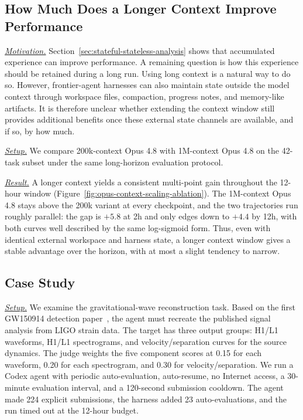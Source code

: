 \subsection{How Much Does a Longer Context Improve Performance}
\label{sec:context-length-analysis}
\label{sec:ralphloop}

\underline{\textit{Motivation.}} Section~\ref{sec:stateful-stateless-analysis} shows that accumulated experience can improve performance. A remaining question is how this experience should be retained during a long run. Using long context is a natural way to do so. However, frontier-agent harnesses can also maintain state outside the model context through workspace files, compaction, progress notes, and memory-like artifacts. It is therefore unclear whether extending the context window still provides additional benefits once these external state channels are available, and if so, by how much.

\underline{\textit{Setup.}} We compare 200k-context Opus 4.8 with 1M-context Opus 4.8 on the 42-task subset under the same long-horizon evaluation protocol.

\underline{\textit{Result.}} A longer context yields a consistent multi-point gain throughout the 12-hour window (Figure~\ref{fig:opus-context-scaling-ablation}). The 1M-context Opus 4.8 stays above the 200k variant at every checkpoint, and the two trajectories run roughly parallel: the gap is $+5.8$ at 2h and only edges down to $+4.4$ by 12h, with both curves well described by the same log-sigmoid form. Thus, even with identical external workspace and harness state, a longer context window gives a stable advantage over the horizon, with at most a slight tendency to narrow.

\subsection{Case Study}
\label{sec:case-study}

\underline{\textit{Setup.}} We examine the gravitational-wave reconstruction task. Based on the first GW150914 detection paper~\cite{abbott2016observation}, the agent must recreate the published signal analysis from LIGO strain data. The target has three output groups: H1/L1 waveforms, H1/L1 spectrograms, and velocity/separation curves for the source dynamics. The judge weights the five component scores at 0.15 for each waveform, 0.20 for each spectrogram, and 0.30 for velocity/separation. We run a Codex agent with periodic auto-evaluation, auto-resume, no Internet access, a 30-minute evaluation interval, and a 120-second submission cooldown. The agent made 224 explicit submissions, the harness added 23 auto-evaluations, and the run timed out at the 12-hour budget.

